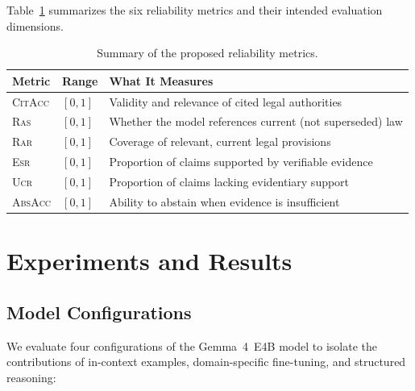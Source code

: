 \documentclass[11pt,a4paper]{article}
\newcommand{\model}{Gemma~4~E4B}
\newcommand{\citacc}{\textsc{CitAcc}}
\newcommand{\ras}{\textsc{Ras}}
\newcommand{\rar}{\textsc{Rar}}
\newcommand{\esr}{\textsc{Esr}}
\newcommand{\ucr}{\textsc{Ucr}}
\newcommand{\absacc}{\textsc{AbsAcc}}
\begin{document}
Table~\ref{tab:metrics_summary} summarizes the six reliability metrics and their intended evaluation dimensions.

\begin{table}[htbp]
\centering
\caption{Summary of the proposed reliability metrics.}
\label{tab:metrics_summary}
\begin{tabular}{@{}llp{5.5cm}@{}}
\toprule
\textbf{Metric} & \textbf{Range} & \textbf{What It Measures} \\
\midrule
\citacc   & $[0, 1]$ & Validity and relevance of cited legal authorities \\
\ras      & $[0, 1]$ & Whether the model references current (not superseded) law \\
\rar      & $[0, 1]$ & Coverage of relevant, current legal provisions \\
\esr      & $[0, 1]$ & Proportion of claims supported by verifiable evidence \\
\ucr      & $[0, 1]$ & Proportion of claims lacking evidentiary support \\
\absacc   & $[0, 1]$ & Ability to abstain when evidence is insufficient \\
\bottomrule
\end{tabular}
\end{table}

\section{Experiments and Results}
\label{sec:experiments}

\subsection{Model Configurations}

We evaluate four configurations of the \model{} model to isolate the contributions of in-context examples, domain-specific fine-tuning, and structured reasoning:
\end{document}
